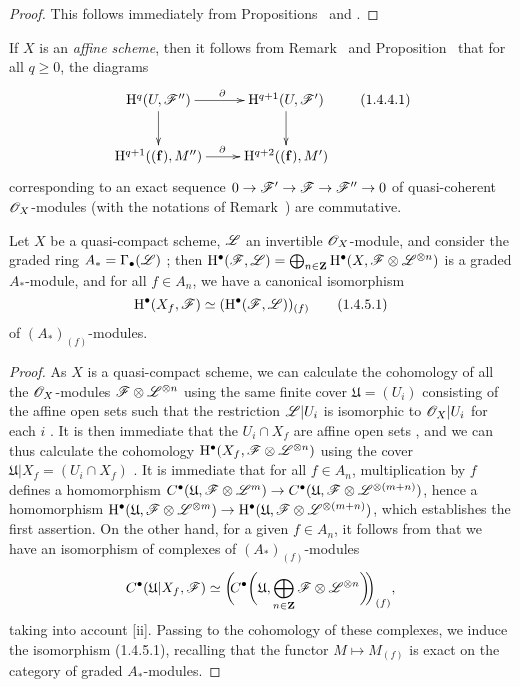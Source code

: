 \begin{proof}
This follows immediately from Propositions~ and .
\end{proof}

\begin{env}[1.4.4]
\label{III.1.4.4}
If $X$ is an \emph{affine scheme}, then it follows from Remark~ and Proposition~ that for all $q\geq 0$, the diagrams
\[
  \xymatrix{
    \HH^q(U,\sh{F}'')\ar[r]^\partial\ar[d] &
    \HH^{q+1}(U,\sh{F}')\ar[d]\\
    \HH^{q+1}((\mathbf{f}),M'')\ar[r]^\partial &
    \HH^{q+2}((\mathbf{f}),M')
  }
  \tag{1.4.4.1}
\]
corresponding to an exact sequence $0\to\sh{F}'\to\sh{F}\to\sh{F}''\to 0$ of quasi-coherent $\mathscr{O}_X$-modules (with the notations of Remark~) are commutative.
\end{env}

\begin{proposition}[1.4.5]
\label{III.1.4.5}
Let $X$ be a quasi-compact scheme, $\mathscr{L}$ an invertible $\mathscr{O}_X$-module, and consider the graded ring $A_*=\Gamma_\bullet(\mathscr{L})$ ; then $\mathrm{H}^\bullet(\mathscr{F},\mathscr{L})=\bigoplus_{n\in\mathbf{Z}}\mathrm{H}^\bullet(X,\mathscr{F}\otimes\mathscr{L}^{\otimes n})$ is a graded $A_*$-module, and for all $f\in A_n$, we have a canonical isomorphism
\[
  \mathrm{H}^\bullet(X_f,\mathscr{F})\simeq(\mathrm{H}^\bullet(\mathscr{F},\mathscr{L}))_{(f)}
  \tag{1.4.5.1}
\]
of $(A_*)_{(f)}$-modules.
\end{proposition}

\begin{proof}
As $X$ is a quasi-compact scheme, we can calculate the cohomology of all the $\mathscr{O}_X$-modules $\mathscr{F}\otimes\mathscr{L}^{\otimes n}$ using the same finite cover $\mathfrak{U}=(U_i)$ consisting of the affine open sets such that the restriction $\mathscr{L}|U_i$ is isomorphic to $\mathscr{O}_X|U_i$ for each $i$ .
It is then immediate that the $U_i\cap X_f$ are affine open sets , and we can thus calculate the cohomology $\mathrm{H}^\bullet(X_f,\mathscr{F}\otimes\mathscr{L}^{\otimes n})$ using the cover $\mathfrak{U}|X_f=(U_i\cap X_f)$ .
It is immediate that for all $f\in A_n$, multiplication by $f$ defines a homomorphism $C^\bullet(\mathfrak{U},\sh{F}\otimes\sh{L}^m)\to C^\bullet(\mathfrak{U},\sh{F}\otimes\sh{L}^{\otimes(m+n)})$, hence a homomorphism $\HH^\bullet(\mathfrak{U},\sh{F}\otimes\sh{L}^{\otimes m})\to\HH^\bullet(\mathfrak{U},\sh{F}\otimes\sh{L}^{\otimes(m+n)})$, which establishes the first assertion.
On the other hand, for a given $f\in A_n$, it follows from  that we have an isomorphism of complexes of $(A_*)_{(f)}$-modules
\[
  C^\bullet(\mathfrak{U}|X_f,\mathscr{F})\simeq\bigg(\!\!C^\bullet\bigg(\mathfrak{U},\bigoplus_{n\in\mathbf{Z}}\mathscr{F}\otimes\mathscr{L}^{\otimes n}\bigg)\!\!\bigg)_{(f)},
\]
taking into account [ii].
Passing to the cohomology of these complexes, we induce the isomorphism (1.4.5.1), recalling that the functor $M\mapsto M_{(f)}$ is exact on the category of graded $A_*$-modules.
\end{proof}

